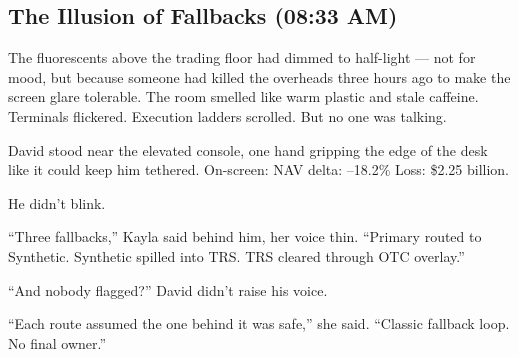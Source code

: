 \subsection{The Illusion of Fallbacks (08:33 AM)} 
The fluorescents above the trading floor had dimmed to half-light — not for mood, but because someone had 
killed the overheads three hours ago to make the screen glare tolerable. The room smelled like warm plastic and stale caffeine. Terminals flickered. Execution ladders scrolled. But no one was talking.

David stood near the elevated console, one hand gripping the edge of the desk like it could keep him tethered. On-screen:
NAV delta: –18.2\%
Loss: \$2.25 billion.

He didn’t blink.

“Three fallbacks,” Kayla said behind him, her voice thin. “Primary routed to Synthetic. Synthetic spilled into TRS. 
TRS cleared through OTC overlay.”

“And nobody flagged?” David didn’t raise his voice.

“Each route assumed the one behind it was safe,” she said. “Classic fallback loop. No final owner.”

